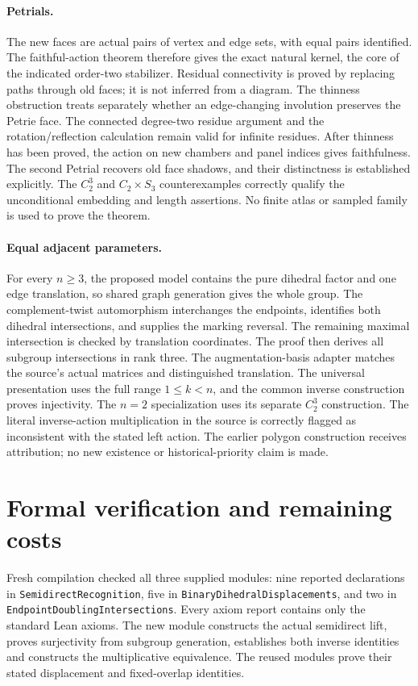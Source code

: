 \documentclass[11pt]{article}
\begin{document}
\paragraph{Petrials.}
The new faces are actual pairs of vertex and edge sets, with equal pairs
identified. The faithful-action theorem therefore gives the exact natural
kernel, the core of the indicated order-two stabilizer. Residual connectivity
is proved by replacing paths through old faces; it is not inferred from a
diagram. The thinness obstruction treats separately whether an edge-changing
involution preserves the Petrie face. The connected degree-two residue argument
and the rotation/reflection calculation remain valid for infinite residues.
After thinness has been proved, the action on new chambers and panel indices
gives faithfulness. The second Petrial recovers old face shadows, and their
distinctness is established explicitly. The $C_2^3$ and $C_2\times S_3$
counterexamples correctly qualify the unconditional embedding and length
assertions. No finite atlas or sampled family is used to prove the theorem.

\paragraph{Equal adjacent parameters.}
For every $n\geq3$, the proposed model contains the pure dihedral factor and
one edge translation, so shared graph generation gives the whole group. The
complement-twist automorphism interchanges the endpoints, identifies both
dihedral intersections, and supplies the marking reversal. The remaining
maximal intersection is checked by translation coordinates. The proof then
derives all subgroup intersections in rank three. The augmentation-basis
adapter matches the source's actual matrices and distinguished translation.
The universal presentation uses the full range $1\leq k<n$, and the common
inverse construction proves injectivity. The $n=2$ specialization uses its
separate $C_2^3$ construction. The literal inverse-action multiplication in the
source is correctly flagged as inconsistent with the stated left action.
The earlier polygon construction receives attribution; no new existence or
historical-priority claim is made.

\section{Formal verification and remaining costs}

Fresh compilation checked all three supplied modules: nine reported
declarations in \texttt{SemidirectRecognition}, five in
\texttt{BinaryDihedralDisplacements}, and two in
\texttt{EndpointDoublingIntersections}. Every axiom report contains only the
standard Lean axioms. The new module constructs the actual semidirect lift,
proves surjectivity from subgroup generation, establishes both inverse
identities and constructs the multiplicative equivalence. The reused modules
prove their stated displacement and fixed-overlap identities.
\end{document}

